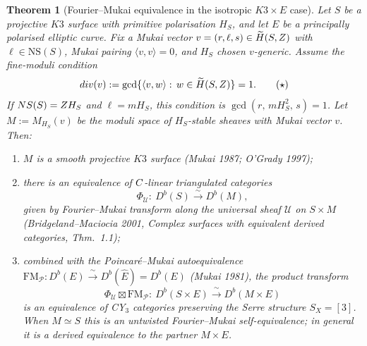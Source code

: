 \documentclass[12pt]{amsart}
\newtheorem{thm}{Theorem}[section]
\theoremstyle{remark}
\begin{document}
\begin{thm}[Fourier--Mukai equivalence in the isotropic \(K3\times E\) case]
  \label{thm:fm-self-duality-k3e}
  Let $S$ be a projective $K3$ surface with primitive polarisation
  $H_S$, and let $E$ be a principally polarised elliptic curve. Fix a
  Mukai vector $v = (r, \ell, s) \in \widetilde{H}(S, Z)$ with $\ell
  \in \mathrm{NS}(S)$, Mukai pairing \(\langle v,v\rangle=0\), and
  $H_S$ chosen $v$-generic. Assume the fine-moduli condition
  \begin{equation}\label{eq:coprimality-star}
    div(v):=
    \gcd\{\langle v,w\rangle:\,w\in\widetilde H(S,Z)\}=1. \tag{$\star$}
  \end{equation}
  If \(NS(S)=Z H_S\) and \(\ell=mH_S\), this condition is
  \(\gcd(r,\,mH_S^2,\,s)=1\).
  Let $M := M_{H_S}(v)$ be the moduli space of $H_S$-stable sheaves
  with Mukai vector $v$. Then:
  \begin{enumerate}
    \item $M$ is a smooth projective $K3$ surface (Mukai 1987;
      O'Grady 1997);
    \item there is an equivalence of $C$-linear triangulated
      categories
      $$\Phi_{\mathcal{U}} :\ D^b(S) \xrightarrow{\,\sim\,} D^b(M),$$
      given by Fourier--Mukai transform along the universal sheaf
      $\mathcal{U}$ on $S \times M$ (Bridgeland--Maciocia 2001,
      \emph{Complex surfaces with equivalent derived categories},
      Thm.\ 1.1);
    \item combined with the Poincar\'e--Mukai autoequivalence
      $\mathrm{FM}_{\mathcal{P}} : D^b(E) \xrightarrow{\,\sim\,}
      D^b(\hat{E}) = D^b(E)$ (Mukai 1981), the product transform
      $$\Phi_{\mathcal{U}} \boxtimes \mathrm{FM}_{\mathcal{P}} :\
        D^b(S \times E) \xrightarrow{\,\sim\,}
        D^b(M \times E)$$
      is an equivalence of CY$_3$ categories preserving the Serre
      structure $S_{X} = [3]$.  When \(M\simeq S\) this is an
      untwisted Fourier--Mukai self-equivalence; in general it is a
      derived equivalence to the partner \(M\times E\).
  \end{enumerate}
\end{thm}
\end{document}
